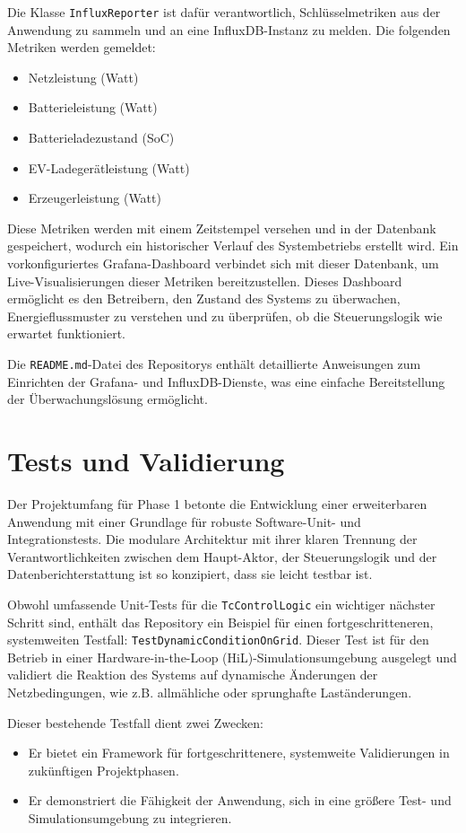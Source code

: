 \documentclass{article}
\begin{document}
Die Klasse \texttt{InfluxReporter} ist dafür verantwortlich, Schlüsselmetriken aus der Anwendung zu sammeln und an eine InfluxDB-Instanz zu melden. Die folgenden Metriken werden gemeldet:
\begin{itemize}
    \item Netzleistung (Watt)
    \item Batterieleistung (Watt)
    \item Batterieladezustand (SoC)
    \item EV-Ladegerätleistung (Watt)
    \item Erzeugerleistung (Watt)
\end{itemize}

Diese Metriken werden mit einem Zeitstempel versehen und in der Datenbank gespeichert, wodurch ein historischer Verlauf des Systembetriebs erstellt wird. Ein vorkonfiguriertes Grafana-Dashboard verbindet sich mit dieser Datenbank, um Live-Visualisierungen dieser Metriken bereitzustellen. Dieses Dashboard ermöglicht es den Betreibern, den Zustand des Systems zu überwachen, Energieflussmuster zu verstehen und zu überprüfen, ob die Steuerungslogik wie erwartet funktioniert.

Die \texttt{README.md}-Datei des Repositorys enthält detaillierte Anweisungen zum Einrichten der Grafana- und InfluxDB-Dienste, was eine einfache Bereitstellung der Überwachungslösung ermöglicht.

\section{Tests und Validierung}
Der Projektumfang für Phase 1 betonte die Entwicklung einer erweiterbaren Anwendung mit einer Grundlage für robuste Software-Unit- und Integrationstests. Die modulare Architektur mit ihrer klaren Trennung der Verantwortlichkeiten zwischen dem Haupt-Aktor, der Steuerungslogik und der Datenberichterstattung ist so konzipiert, dass sie leicht testbar ist.

Obwohl umfassende Unit-Tests für die \texttt{TcControlLogic} ein wichtiger nächster Schritt sind, enthält das Repository ein Beispiel für einen fortgeschritteneren, systemweiten Testfall: \texttt{TestDynamicConditionOnGrid}. Dieser Test ist für den Betrieb in einer Hardware-in-the-Loop (HiL)-Simulationsumgebung ausgelegt und validiert die Reaktion des Systems auf dynamische Änderungen der Netzbedingungen, wie z.B. allmähliche oder sprunghafte Laständerungen.

Dieser bestehende Testfall dient zwei Zwecken:
\begin{itemize}
    \item Er bietet ein Framework für fortgeschrittenere, systemweite Validierungen in zukünftigen Projektphasen.
    \item Er demonstriert die Fähigkeit der Anwendung, sich in eine größere Test- und Simulationsumgebung zu integrieren.
\end{itemize}
\end{document}
